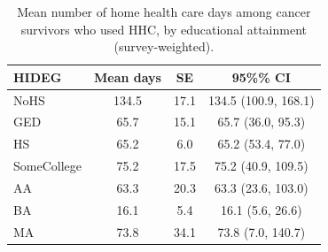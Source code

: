 
\begin{longtable}[t]{lccc}
\caption{\label{tab:tab:days-educ}Mean number of home health care days among cancer survivors who used HHC, by educational attainment (survey-weighted).}\\
\toprule
HIDEG & Mean days & SE & 95\%\% CI\\
\midrule
NoHS & 134.5 & 17.1 & 134.5 (100.9, 168.1)\\
GED & 65.7 & 15.1 & 65.7 (36.0, 95.3)\\
HS & 65.2 & 6.0 & 65.2 (53.4, 77.0)\\
SomeCollege & 75.2 & 17.5 & 75.2 (40.9, 109.5)\\
AA & 63.3 & 20.3 & 63.3 (23.6, 103.0)\\
\addlinespace
BA & 16.1 & 5.4 & 16.1 (5.6, 26.6)\\
MA & 73.8 & 34.1 & 73.8 (7.0, 140.7)\\
\bottomrule
\end{longtable}
